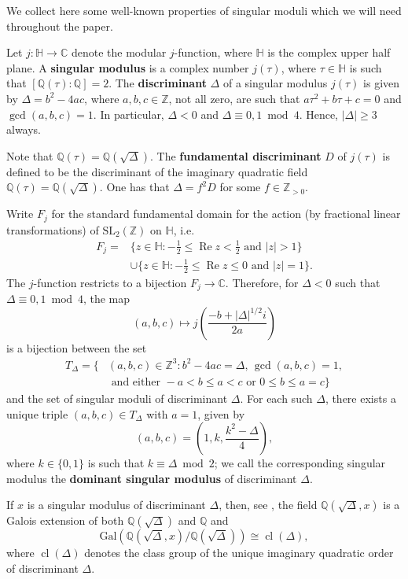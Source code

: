 \documentclass[11pt,a4paper, british]{amsart}
\theoremstyle{definition}
\theoremstyle{remark}
\numberwithin{equation}{section}
\newcommand{\Q}{\mathbb{Q}} %
\newcommand{\Z}{\mathbb{Z}} %
\newcommand{\C}{\mathbb{C}} %
\newcommand{\h}{\mathbb{H}} %
\newcommand{\SL}{\mathrm{SL}_2(\Z)} %
\newcommand{\Gal}{\mathrm{Gal}} %
\DeclareMathOperator{\re}{Re} %
\DeclareMathOperator{\cl}{cl} %
\begin{document}
We collect here some well-known properties of singular moduli which we will need throughout the paper. 

Let $j \colon \h \to \C$ denote the modular $j$-function, where $\h$ is the complex upper half plane. A \textbf{singular modulus} is a complex number $j(\tau)$, where $\tau \in \h$ is such that $[\Q(\tau) : \Q] = 2$. The \textbf{discriminant} $\Delta$ of a singular modulus $j(\tau)$ is given by $\Delta = b^2-4ac$, where $a, b, c \in \Z$, not all zero, are such that $a \tau^2 + b \tau + c = 0$ and $\gcd(a, b, c) = 1$. In particular, $\Delta < 0$ and $\Delta \equiv 0, 1 \bmod 4$. Hence, $\lvert \Delta \rvert \geq 3$ always. 

Note that $\Q(\tau) = \Q(\sqrt{\Delta})$. The \textbf{fundamental discriminant} $D$ of $j(\tau)$ is defined to be the discriminant of the imaginary quadratic field $\Q(\tau) = \Q(\sqrt{\Delta})$. One has that $\Delta = f^2 D$ for some $f \in \Z_{>0}$.

Write $F_j$ for the standard fundamental domain for the action (by fractional linear transformations) of $\SL$ on $\h$, i.e.
\begin{align*}
	F_j = &\{ z \in \h : -\frac{1}{2} \leq \re z < \frac{1}{2} \mbox{ and } \lvert z \rvert > 1\}\\
	&\cup \{ z \in \h : -\frac{1}{2} \leq \re z \leq 0 \mbox{ and } \lvert z \rvert = 1\}.
\end{align*}
The $j$-function restricts to a bijection $F_j \to \C$. Therefore, for $\Delta < 0$ such that $\Delta \equiv 0, 1 \bmod 4$, the map
\[ (a, b, c) \mapsto j\left( \frac{-b + \lvert \Delta \rvert^{1/2} i}{2a}\right)\]
is a bijection between the set
\begin{align*} 
	T_\Delta = \{&(a, b, c) \in \Z^3 : b^2 - 4 ac = \Delta, \, \gcd(a,b,c) = 1,\\ &\mbox{ and either } -a<  b \leq a <c \mbox{ or } 0 \leq b \leq a =c\}
\end{align*}
and the set of singular moduli of discriminant $\Delta$. For each such $\Delta$, there exists a unique triple $(a, b, c) \in T_\Delta$ with $a=1$, given by
\[ (a, b, c) = \left(1, k, \frac{k^2-\Delta}{4}\right),\]
where $k \in \{0, 1\}$ is such that $k \equiv \Delta \bmod 2$; we call the corresponding singular modulus the \textbf{dominant singular modulus} of discriminant $\Delta$.

 If $x$ is a singular modulus of discriminant $\Delta$, then, see \cite[Lemma 9.3 \& Theorem 11.1]{Cox22}, the field $\Q(\sqrt{\Delta}, x)$ is a Galois extension of both $\Q(\sqrt{\Delta})$ and $\Q$ and
 \[ \Gal\left(\Q\left(\sqrt{\Delta}, x\right) / \Q\left(\sqrt{\Delta}\right)\right) \cong \cl (\Delta),\]
 where $\cl(\Delta)$ denotes the class group of the unique imaginary quadratic order of discriminant $\Delta$.
 
\end{document}
